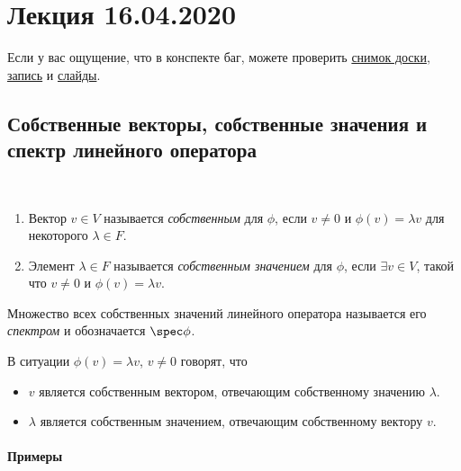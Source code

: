 \section{Лекция 16.04.2020} 

Если у вас ощущение, что в конспекте баг, можете проверить \href{https://www.dropbox.com/s/9ice7q309b19wga/LA_19-20_osn_Lecture28.svg?dl=0}{снимок доски}, \href{https://www.youtube.com/watch?v=Jey544KL9mQ&list=PLEwK9wdS5g0oP4vhnGvQHPSqshML3Ze4P}{запись} и \href{https://www.dropbox.com/s/y4e65rt245cvibz/LinOperators1.pdf?dl=0}{слайды}.

\subsection{Собственные векторы, собственные значения и спектр линейного оператора}

\begin{definition}~
    \begin{enumerate}
    \item Вектор $v \in V$ называется \textit{собственным} для $\phi$, если $v \neq 0$ и $\phi(v) = \lambda v$ для некоторого $\lambda \in F$.
    \item Элемент $\lambda \in F$ называется \textit{собственным значением} для $\phi$, если $\exists v \in V$, такой что $v \neq 0$ и $\phi(v) = \lambda v$.
    \end{enumerate}

    Множество всех собственных значений линейного оператора называется его \textit{спектром} и обозначается $\spec \phi$.
\end{definition}

В ситуации $\phi(v) = \lambda v$, $v \neq 0$ говорят, что
\begin{itemize}[nosep]
\item $v$ является собственным вектором, отвечающим собственному значению $\lambda$.
\item $\lambda$ является собственным значением, отвечающим собственному вектору $v$.
\end{itemize}


\paragraph{Примеры}

